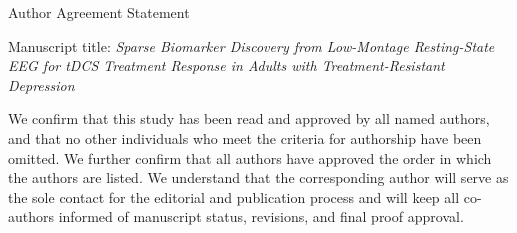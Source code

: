 \documentclass[11pt]{article}
\begin{document}
\begin{center}
{\Large Author Agreement Statement}
\end{center}

\vspace{1em}

Manuscript title: \emph{Sparse Biomarker Discovery from Low-Montage Resting-State EEG for tDCS Treatment Response in Adults with Treatment-Resistant Depression}

We confirm that this study has been read and approved by all named authors, and that no other individuals who meet the criteria for authorship have been omitted. We further confirm that all authors have approved the order in which the authors are listed. We understand that the corresponding author will serve as the sole contact for the editorial and publication process and will keep all co-authors informed of manuscript status, revisions, and final proof approval.

\vspace{2em}
\end{document}

